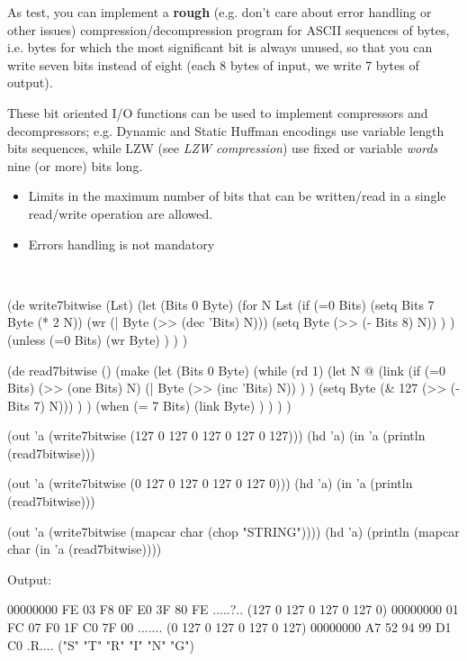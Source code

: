 As test, you can implement a \textbf{rough} (e.g. don't care about error
handling or other issues) compression/decompression program for ASCII
sequences of bytes, i.e. bytes for which the most significant bit is
always unused, so that you can write seven bits instead of eight (each 8
bytes of input, we write 7 bytes of output).

These bit oriented I/O functions can be used to implement compressors
and decompressors; e.g. Dynamic and Static Huffman encodings use
variable length bits sequences, while LZW (see \emph{LZW compression})
use fixed or variable \emph{words} nine (or more) bits long.

\begin{itemize}
\item
  Limits in the maximum number of bits that can be written/read in a
  single read/write operation are allowed.
\end{itemize}

\begin{itemize}
\item
  Errors handling is not mandatory
\end{itemize}

\\



\begin{wideverbatim}

(de write7bitwise (Lst)
   (let (Bits 0  Byte)
      (for N Lst
         (if (=0 Bits)
            (setq Bits 7  Byte (* 2 N))
            (wr (| Byte (>> (dec 'Bits) N)))
            (setq Byte (>> (- Bits 8) N)) ) )
      (unless (=0 Bits)
         (wr Byte) ) ) )

(de read7bitwise ()
   (make
      (let (Bits 0  Byte)
         (while (rd 1)
            (let N @
               (link
                  (if (=0 Bits)
                     (>> (one Bits) N)
                     (| Byte (>> (inc 'Bits) N)) ) )
               (setq Byte (\& 127 (>> (- Bits 7) N))) ) )
         (when (= 7 Bits)
            (link Byte) ) ) ) )


(out 'a (write7bitwise (127 0 127 0 127 0 127 0 127)))
(hd 'a)
(in 'a (println (read7bitwise)))

(out 'a (write7bitwise (0 127 0 127 0 127 0 127 0)))
(hd 'a)
(in 'a (println (read7bitwise)))

(out 'a (write7bitwise (mapcar char (chop "STRING"))))
(hd 'a)
(println (mapcar char (in 'a (read7bitwise))))

Output:

00000000  FE 03 F8 0F E0 3F 80 FE                          .....?..
(127 0 127 0 127 0 127 0)
00000000  01 FC 07 F0 1F C0 7F 00                          .......
(0 127 0 127 0 127 0 127)
00000000  A7 52 94 99 D1 C0                                .R....
("S" "T" "R" "I" "N" "G")

\end{wideverbatim}

